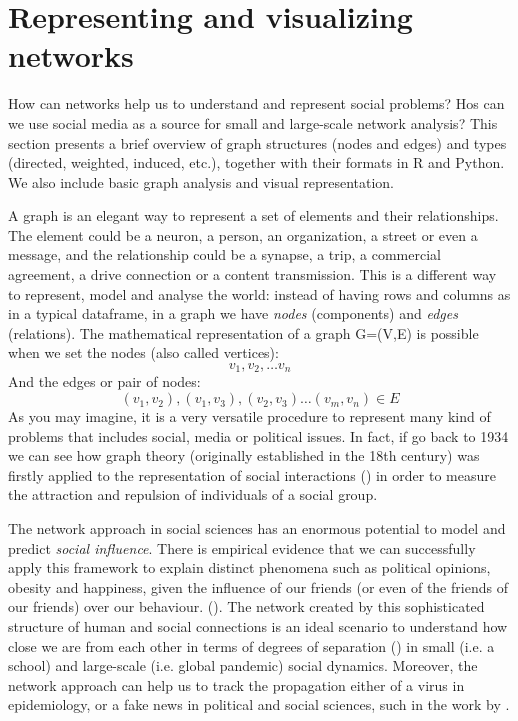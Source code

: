 \section{Representing and visualizing networks}
\label{sec:graph}

How can networks help us to understand and represent social problems? Hos can we use social media as a source for small and large-scale network analysis? This section presents a brief overview of graph structures (nodes and edges) and types (directed, weighted, induced, etc.), together with their formats in R and Python. We also include basic graph analysis and visual representation. 
 
A graph is an elegant way to represent a set of elements and their relationships. The element could be a neuron, a person, an organization, a street or even a message, and the relationship could be a synapse, a trip, a commercial agreement, a drive connection or a content transmission. This is a different way to represent, model and analyse the world: instead of having rows and columns as in a typical dataframe, in a graph we have \textit{nodes} (components) and \textit{edges} (relations). The mathematical representation of a graph G=(V,E) is possible when we set the nodes (also called vertices): \[{v_{1}, v_{2},… v_{n}}\] And the edges or pair of nodes: \[{(v_{1}, v_{2}), (v_{1}, v_{3}), (v_{2},v_{3}) … (v_{m}, v_{n}) \in E}\] As you may imagine, it is a very versatile procedure to represent many kind of problems that includes social, media or political issues. In fact, if go back to 1934 we can see how graph theory (originally established in the 18th century) was firstly applied to the representation of social interactions (\cite{moreno1934shall}) in order to measure the attraction and repulsion of individuals of a social group.

The network approach in social sciences has an enormous potential to model and predict \textit{social influence}. There is empirical evidence that we can successfully apply this framework to explain distinct phenomena such as political opinions, obesity and happiness, given the influence of our friends (or even of the friends of our friends) over our behaviour. (\cite{christakis2009connected}). The network created by this sophisticated structure of human and social connections is an ideal scenario to understand how close we are from each other in terms of degrees of separation (\cite{watts2004six}) in small (i.e. a school) and large-scale (i.e. global pandemic) social dynamics. Moreover, the network approach can help us to track the propagation either of a virus in epidemiology, or a fake news in political and social sciences, such in the work by 
\citet{vosoughi2018spread}. 

